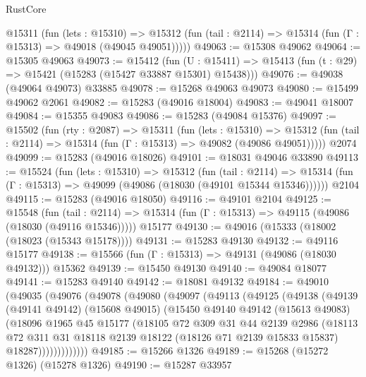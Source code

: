 \begin{lexlean}{RustCore}
\begin{coremodule}
    @15311
      (fun (lets : @15310) =>
      @15312 (fun (tail : @2114) => @15314 (fun (Γ : @15313) => @49018 (@49045 @49051)))))
@49063 := @15308 @49062
@49064 := @15305 @49063
@49073 := @15412
    (fun (U : @15411) => @15413 (fun (t : @29) => @15421 (@15283 (@15427 @33887 @15301) @15438)))
@49076 := @49038 (@49064 @49073) @33885
@49078 := @15268 @49063 @49073
@49080 := @15499 @49062 @2061
@49082 := @15283 (@49016 @18004)
@49083 := @49041 @18007
@49084 := @15355 @49083
@49086 := @15283 (@49084 @15376)
@49097 := @15502
    (fun (rty : @2087) =>
    @15311
      (fun (lets : @15310) =>
      @15312 (fun (tail : @2114) => @15314 (fun (Γ : @15313) => @49082 (@49086 @49051)))))
    @2074
@49099 := @15283 (@49016 @18026)
@49101 := @18031 @49046 @33890
@49113 := @15524
    (fun (lets : @15310) =>
    @15312
      (fun (tail : @2114) =>
      @15314 (fun (Γ : @15313) => @49099 (@49086 (@18030 (@49101 @15344 @15346))))))
    @2104
@49115 := @15283 (@49016 @18050)
@49116 := @49101 @2104
@49125 := @15548
    (fun (tail : @2114) => @15314 (fun (Γ : @15313) => @49115 (@49086 (@18030 (@49116 @15346)))))
    @15177
@49130 := @49016 (@15333 (@18002 (@18023 (@15343 @15178))))
@49131 := @15283 @49130
@49132 := @49116 @15177
@49138 := @15566 (fun (Γ : @15313) => @49131 (@49086 (@18030 @49132))) @15362
@49139 := @15450 @49130
@49140 := @49084 @18077
@49141 := @15283 @49140
@49142 := @18081 @49132
@49184 := @49010
    (@49035
      (@49076
        (@49078
          (@49080
            (@49097
              (@49113
                (@49125
                  (@49138
                    (@49139
                      (@49141 @49142)
                      (@15608 @49015)
                      (@15450
                        @49140
                        @49142
                        (@15613 @49083)
                        (@18096
                          @1965
                          @45
                          @15177
                          (@18105
                            @72
                            @309
                            @31
                            @44
                            @2139
                            @2986
                            (@18113
                              @72
                              @311
                              @31
                              @18118
                              @2139
                              @18122
                              (@18126 @71 @2139 @15833 @15837)
                              @18287)))))))))))))
@49185 := @15266 @1326
@49189 := @15268 (@15272 @1326) (@15278 @1326)
@49190 := @15287 @33957

\end{coremodule}
\end{lexlean}
